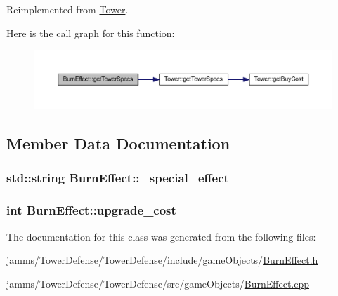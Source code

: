 Reimplemented from \hyperlink{class_tower_a2427fab36824f8ec98273cb5e563e0c9}{Tower}.



Here is the call graph for this function\+:
\nopagebreak
\begin{figure}[H]
\begin{center}
\leavevmode
\includegraphics[width=350pt]{class_burn_effect_a696db158260eaf01e3b497b6d400230e_cgraph}
\end{center}
\end{figure}




\subsection{Member Data Documentation}
\hypertarget{class_burn_effect_ad58f1d22fde66045dbe00d04873be296}{
\subsubsection[{\+\_\+special\+\_\+effect}]{\setlength{\rightskip}{0pt plus 5cm}std\+::string Burn\+Effect\+::\+\_\+special\+\_\+effect\hspace{0.3cm}{\ttfamily [private]}}}\label{class_burn_effect_ad58f1d22fde66045dbe00d04873be296}
\hypertarget{class_burn_effect_a11035a16e0bb8e1bd21e95d256d1c570}{
\subsubsection[{upgrade\+\_\+cost}]{\setlength{\rightskip}{0pt plus 5cm}int Burn\+Effect\+::upgrade\+\_\+cost\hspace{0.3cm}{\ttfamily [static]}}}\label{class_burn_effect_a11035a16e0bb8e1bd21e95d256d1c570}


The documentation for this class was generated from the following files\+:\begin{DoxyCompactItemize}
\item 
jamms/\+Tower\+Defense/\+Tower\+Defense/include/game\+Objects/\hyperlink{_burn_effect_8h}{Burn\+Effect.\+h}\item 
jamms/\+Tower\+Defense/\+Tower\+Defense/src/game\+Objects/\hyperlink{_burn_effect_8cpp}{Burn\+Effect.\+cpp}\end{DoxyCompactItemize}

